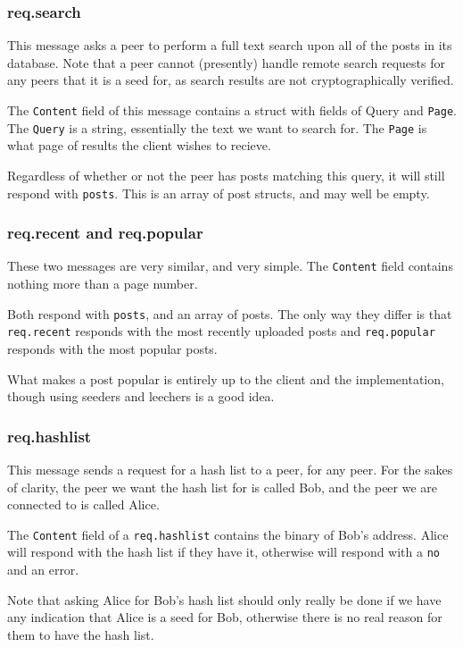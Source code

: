 	\subsubsection{req.search}
	\begin{multicols}{2}
		This message asks a peer to perform a full text search upon all of the
		posts in its database. Note that a peer cannot (presently) handle remote
		search requests for any peers that it is a seed for, as search results
		are not cryptographically verified.

		The \texttt{Content} field of this message contains a struct with fields of Query
		and \texttt{Page}. The \texttt{Query} is a string, essentially the text we want to search
		for. The \texttt{Page} is what page of results the client wishes to recieve.

		Regardless of whether or not the peer has posts matching this query, it
		will still respond with \texttt{posts}. This is an array of post
		structs, and may well be empty.
	\end{multicols}
	\newpage
	\subsubsection{req.recent and req.popular}
	\begin{multicols}{2}
		These two messages are very similar, and very simple. The \texttt{Content} field
		contains nothing more than a page number.

		Both respond with \texttt{posts}, and an array of posts. The only way
		they differ is that \texttt{req.recent} responds with the most recently
		uploaded posts and \texttt{req.popular} responds with the most popular
		posts.

		What makes a post popular is entirely up to the client and the implementation,
		though using seeders and leechers is a good idea.
	\end{multicols}

	\subsubsection{req.hashlist}
	\begin{multicols}{2}
		This message sends a request for a hash list to a peer, for any peer.
		For the sakes of clarity, the peer we want the hash list for is called
		Bob, and the peer we are connected to is called Alice. 
		
		The \texttt{Content} field of a \texttt{req.hashlist} contains the binary of
		Bob's address. Alice will respond with the hash list if they have it,
		otherwise will respond with a \texttt{no} and an error.

		Note that asking Alice for Bob's hash list should only really be done
		if we have any indication that Alice is a seed for Bob, otherwise there
		is no real reason for them to have the hash list.
	\end{multicols}

